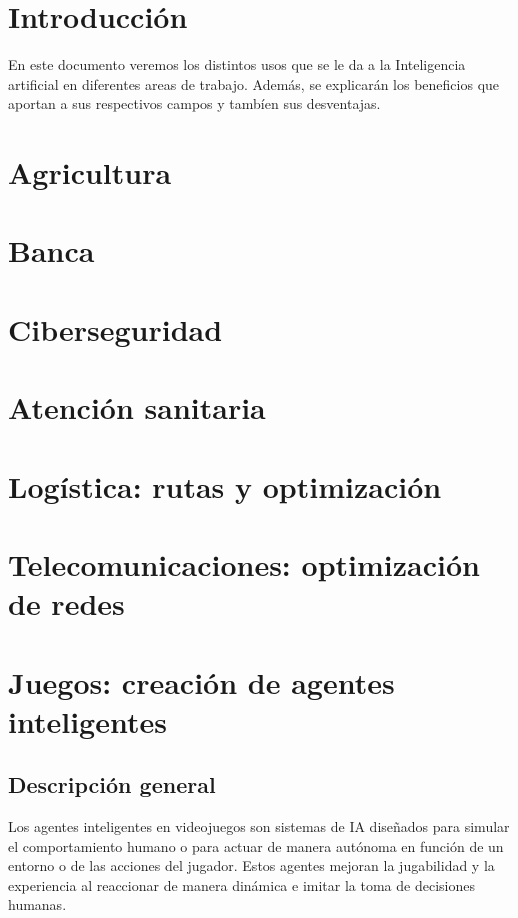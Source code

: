 \documentclass[12pt]{article}
\begin{document}
\section{Introducción}

En este documento veremos los distintos usos que se le da a la Inteligencia artificial en diferentes areas
de trabajo. Además, se explicarán los beneficios que aportan a sus respectivos campos y tambíen sus desventajas.

\section{Agricultura}
\section{Banca}
\section{Ciberseguridad}
\section{Atención sanitaria}
\section{Logística: rutas y optimización}
\section{Telecomunicaciones: optimización de redes}
\section{Juegos: creación de agentes inteligentes}
\subsection{Descripción general}
Los agentes inteligentes en videojuegos son sistemas de IA diseñados para simular el comportamiento humano o para actuar de manera
autónoma en función de un entorno o de las acciones del jugador. Estos agentes mejoran la jugabilidad y la experiencia al reaccionar 
de manera dinámica e imitar la toma de decisiones humanas.
\end{document}
